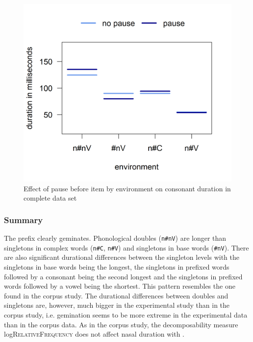 					\begin{figure}[h!]
	\centering
	\includegraphics [scale=0.5] {images/Experiment/unModelCompleteInterEnvPause}
	\caption{Effect of pause before item by environment on consonant duration in complete data set}
	\label{fig:NumNasal Pauseun experiment}
\end{figure}



\subsubsection{Summary}


The prefix  clearly geminates. Phonological doubles (\texttt{n\#nV})  are longer than singletons in complex words (\texttt{n\#C}, \texttt{n\#V}) and singletons in base words (\texttt{\#nV}). There are also significant durational differences between the singleton levels with the singletons in base words being the longest, the singletons in prefixed words followed by a consonant being the second longest and the singletons in prefixed words followed by a vowel being the shortest. This pattern resembles the one found in the corpus study. The durational differences between doubles and singletons are, however, much bigger in the experimental study than in the corpus study, i.e. gemination seems to be more extreme in the experimental data than in the corpus data. 
As in the corpus study, the decomposability measure log\textsc{RelativeFrequency} does not affect nasal duration with .


